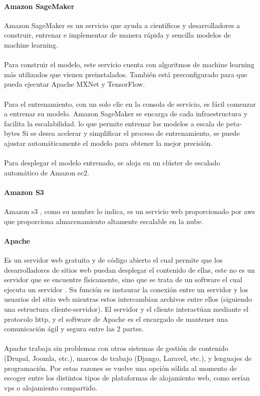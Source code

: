 \documentclass[12pt, a4paper, titlepage]{report}
\begin{document}
		   	\paragraph{Amazon SageMaker \\}
		   	Amazon SageMaker \cite{amazon_sagemaker} es un servicio que ayuda a científicos y desarrolladores a construir, entrenar e implementar de manera rápida y sencilla modelos de machine learning.\\\\
		   	Para construir el modelo, este servicio cuenta con algoritmos de machine learning más utilizados que vienen preinstalados. También está preconfigurado para que pueda ejecutar Apache MXNet y TensorFlow.\\\\
		   	Para el entrenamiento, con un solo clic en la consola de servicio, es fácil comenzar a entrenar su modelo. Amazon SageMaker se encarga de cada infraestructura y facilita la escalabilidad. lo que permite entrenar los modelos a escala de peta-bytes Si se desea acelerar y simplificar el proceso de entrenamiento, se puede ajustar automáticamente el modelo para obtener la mejor precisión.\\\\
		   	Para desplegar el modelo entrenado, se aloja en un clúster de escalado automático de Amazon \acrshort{ec2}.		
		   	\newpage	
		   	
		   	\paragraph{Amazon S3 \\}
		   	Amazon \acrfull{s3} \cite{amazon_s3}, como su nombre lo indica, es un servicio web proporcionado por \acrfull{aws} que proporciona almacenamiento altamente escalable en la nube. 
		   	
		   	\paragraph{Apache \\}
		   	Es un servidor web gratuito y de código abierto el cual permite que los desarrolladores de sitios web puedan desplegar el contenido de ellas, este no es un servidor que se encuentre físicamente, sino que se trata de un software el cual ejecuta un servidor \cite{refTomcat}. Su función es instaurar la conexión entre un servidor y los usuarios del sitio web mientras estos intercambian archivos entre ellos (siguiendo una estructura cliente-servidor). El servidor y el cliente interactúan mediante el protocolo \acrshort{http}, y el software de Apache es el encargado de mantener una comunicación ágil y segura entre las 2 partes.\\\\
		   	Apache trabaja sin problemas con otros sistemas de gestión de contenido (Drupal, Joomla, etc.), marcos de trabajo (Django, Laravel, etc.), y lenguajes de programación. Por estas razones se vuelve una opción sólida al momento de escoger entre los distintos tipos de plataformas de alojamiento web, como serían \acrfull{vps} o alojamiento compartido.\\
\end{document}
